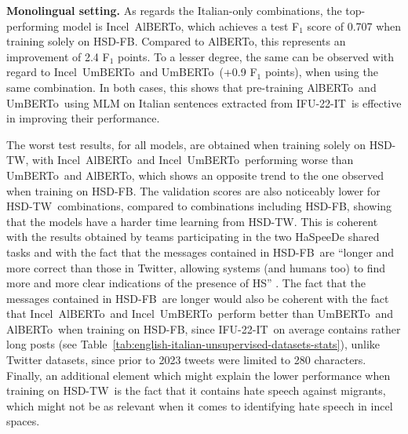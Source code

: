 \documentclass[11pt]{article}
\newcommand{\dsITcorpus}{IFU-22-IT}
\newcommand{\dsITclassification}{IFS-IT}
\newcommand{\umbert}{\mbox{UmBERTo}}
\newcommand{\albert}{\mbox{AlBERTo}}
\newcommand{\iumbert}{\mbox{Incel UmBERTo}}
\newcommand{\ialbert}{\mbox{Incel AlBERTo}}
\newcommand{\hsdfb}{\mbox{HSD-FB}}
\newcommand{\hsdtw}{\mbox{HSD-TW}}
\begin{document}
\vspace*{1mm}\noindent\textbf{Monolingual setting.}
As regards the Italian-only combinations, the top-performing model is \ialbert, which achieves a test F$_1$ score of 0.707 when training solely on \hsdfb. Compared to \albert, this represents an improvement of 2.4 F$_1$ points. To a lesser degree, the same can be observed with regard to \iumbert\, and \umbert\, (+0.9 F$_1$ points), when using the same combination. In both cases, this shows that pre-training \albert\, and \umbert\, using MLM on Italian sentences extracted from \dsITcorpus\, is effective in improving their performance.

The worst test results, for all models, are obtained when training solely on \hsdtw, with \ialbert\, and \iumbert\, performing worse than \umbert\, and \albert, which shows an opposite trend to the one observed when training on \hsdfb.
The validation scores are also noticeably lower for \hsdtw\, combinations, compared to combinations including \hsdfb, showing that the models have a harder time learning from \hsdtw. This is coherent with the results obtained by teams participating in the two HaSpeeDe shared tasks \cite{boscoOverviewEVALITA2018,basileEVALITA2020Overview} and with the fact that the messages contained in \hsdfb\, are ``longer and more correct than those in Twitter, allowing systems (and humans too) to find more and more clear indications of the presence of HS'' \cite{boscoOverviewEVALITA2018}. 
The fact that the messages contained in \hsdfb\, are longer would also be coherent with the fact that \ialbert\, and \iumbert\, perform better than \umbert\, and \albert\, when training on \hsdfb, since \dsITcorpus\, on average contains rather long posts (see Table~\ref{tab:english-italian-unsupervised-datasets-stats}), unlike Twitter datasets, since prior to 2023 tweets were limited to 280 characters.
Finally, an additional element which might explain the lower performance when training on \hsdtw\, is the fact that it contains hate speech against migrants, which might not be as relevant when it comes to identifying hate speech in incel spaces.
\end{document}
